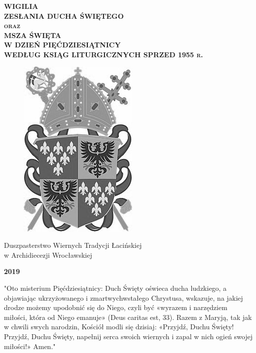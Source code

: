\documentclass[10pt,a5paper]{book}
\begin{document}
	
	\thispagestyle{empty}
	
	\begin{center}
		\vspace*{0.5cm}
		
		
		\bfseries\scshape
		\huge WIGILIA \\ ZESŁANIA DUCHA ŚWIĘTEGO \\\medskip
		\Large oraz \\\medskip
		\huge MSZA ŚWIĘTA \\ W DZIEŃ PIĘĆDZIESIĄTNICY \\\bigskip
		\large WEDŁUG KSIĄG LITURGICZNYCH SPRZED 1955 r.
		
		\vfill
		
		
		\vfill	
		
		\begin{figure}[h]
			\centering
			\includegraphics[width=0.3\linewidth]{logo.jpg}
		\end{figure}
	
		\vfill
		
		{\large Duszpasterstwo Wiernych Tradycji Łacińskiej \\ w Archidiecezji Wrocławskiej}
		
		\bigskip
		
		{\Large \textbf{2019}}
		
		
	\end{center}


	\newpage
	\thispagestyle{empty}
	
	\vspace*{2cm}
	"Oto misterium Pięćdziesiątnicy: Duch Święty oświeca ducha ludzkiego, a objawiając ukrzyżowanego i zmartwychwstałego Chrystusa, wskazuje, na jakiej drodze możemy upodobnić się do Niego, czyli być «wyrazem i narzędziem miłości, która od Niego emanuje» (Deus caritas est, 33). Razem z Maryją, tak jak w chwili swych narodzin, Kościół modli się dzisiaj: «Przyjdź, Duchu Święty! Przyjdź, Duchu Święty, napełnij serca swoich wiernych i zapal w nich ogień swojej miłości!» Amen."
	
\end{document}
